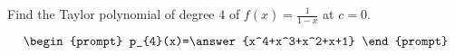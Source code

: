 \documentclass{ximera}
\author{Gregory Hartman \and Matthew Carr}
\begin{document}
\begin{exercise}




Find the Taylor polynomial of degree $4$ of $f(x)=\frac{1}{1-x}$ at $c=0$.

\[
\begin{prompt}
p_{4}(x)=\answer{x^4+x^3+x^2+x+1}
\end{prompt}
\]

\end{exercise}
\end{document}

